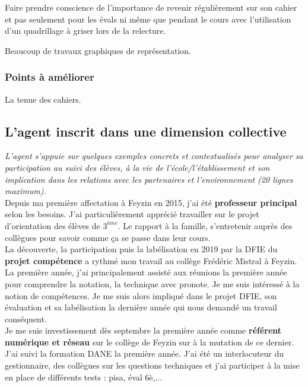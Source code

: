 \documentclass[11pt]{article}
\begin{document}
Faire prendre conscience de l'importance de revenir régulièrement sur son cahier et pas seulement pour les évals ni même que pendant le cours avec l'utilisation d'un quadrillage à griser lors de la relecture. 

Beaucoup de travaux graphiques de représentation. 

\subsubsection{Points à améliorer}

La tenue des cahiers.

\newpage

\subsection{L’agent inscrit dans une dimension collective}

\textit{L’agent s’appuie sur quelques exemples concrets et contextualisés pour analyser sa participation au suivi des élèves, à la vie de l’école/l’établissement et son implication dans les relations avec les partenaires et l’environnement (20 lignes maximum).}\\

Depuis ma première affectation à Feyzin en 2015, j’ai été \textbf{professeur principal} selon les besoins. J'ai particulièrement apprécié travailler sur le projet d’orientation des élèves de $3^{ème}$. Le rapport à la famille, s'entretenir auprès des collègues pour savoir comme ça se passe dans leur cours.\\

La découverte, la participation puis la labélisation en 2019 par la DFIE du \textbf{projet compétence} a rythmé mon travail au collège Frédéric Mistral à Feyzin. La première année, j'ai principalement assisté aux réunions la première année pour comprendre la notation, la technique avec pronote. Je me suis intéressé à la notion de compétences. Je me suis alors impliqué dans le projet DFIE, son évaluation et sa labélisation la dernière année qui nous demandé un travail conséquent.\\

Je me suis investissement dès septembre la première année comme \textbf{référent numérique et réseau} sur le collège de Feyzin sur à la mutation de ce dernier. J'ai suivi la formation DANE la première année. J'ai été un interlocuteur du gestionnaire, des collègues sur les questions techniques et j'ai participer à la mise en place de différents tests : pisa, éval 6è,...\\
\end{document}
